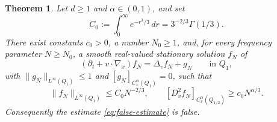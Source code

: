 \documentclass[10pt,a4paper]{amsart}
\numberwithin{equation}{section}
\newtheorem{theorem}{Theorem}[section]
\begin{document}
\begin{theorem}\label{thm:main}
Let \(d\ge1\) and \(\alpha\in(0,1)\), and set
\[
   C_0:=\int_0^\infty e^{-r^3/3}\,dr=3^{-2/3}\Gamma(1/3).
\]
There exist constants \(c_0>0\), a number \(N_0\ge1\), and, for every
frequency parameter \(N\ge N_0\), a smooth real-valued stationary solution \(f_N\) of
\begin{equation}\label{eq:kfp-special}
   (\partial_t+v\cdot\nabla_x)f_N=\Delta_v f_N+g_N
   \qquad\text{in }Q_1,
\end{equation}
with \(\|g_N\|_{L^\infty(Q_1)}\le1\) and
\([g_N]_{C_v^\alpha(Q_1)}=0\), such that
\begin{equation}\label{eq:main-bounds}
   \|f_N\|_{L^\infty(Q_1)}\le C_0N^{-2/3},
   \qquad
   [D_v^2f_N]_{C_v^\alpha(Q_{1/2})}\ge c_0N^{\alpha/3}.
\end{equation}
Consequently the estimate \eqref{eq:false-estimate} is false.
\end{theorem}
\end{document}
